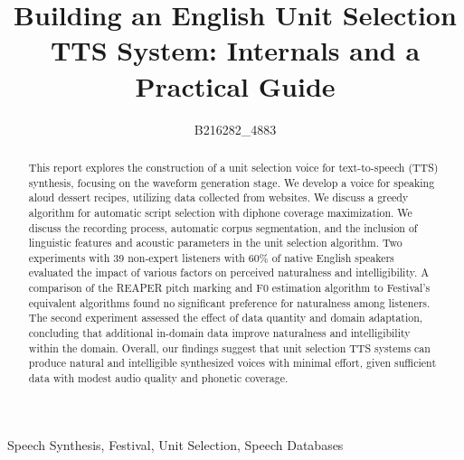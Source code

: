 \documentclass[lettersize,journal]{IEEEtran}
\begin{document}
\title{Building an English Unit Selection TTS System: Internals and a Practical Guide}

\author{B216282\_4883}

\maketitle

\begin{abstract}
    This report explores the construction of a unit selection voice for text-to-speech (TTS) synthesis, focusing on the waveform generation stage. We develop a voice for speaking aloud dessert recipes, utilizing data collected from websites. We discuss a greedy algorithm for automatic script selection with diphone coverage maximization. We discuss the recording process, automatic corpus segmentation, and the inclusion of linguistic features and acoustic parameters in the unit selection algorithm. Two experiments with 39 non-expert listeners with $60\%$ of native English speakers evaluated the impact of various factors on perceived naturalness and intelligibility. A comparison of the REAPER pitch marking and F0 estimation algorithm to Festival's equivalent algorithms found no significant preference for naturalness among listeners. The second experiment assessed the effect of data quantity and domain adaptation, concluding that additional in-domain data improve naturalness and intelligibility within the domain. Overall, our findings suggest that unit selection TTS systems can produce natural and intelligible synthesized voices with minimal effort, given sufficient data with modest audio quality and phonetic coverage.
\end{abstract}

\begin{IEEEkeywords}
Speech Synthesis, Festival, Unit Selection, Speech Databases
\end{IEEEkeywords}
\end{document}
